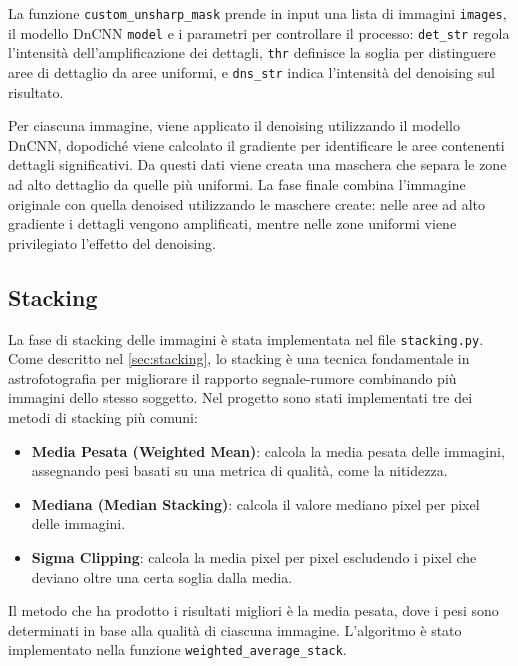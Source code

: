 La funzione \texttt{custom\_unsharp\_mask} prende in input una lista di immagini \texttt{images}, il modello DnCNN \texttt{model} e i parametri per controllare il processo: \texttt{det\_str} regola l'intensità dell'amplificazione dei dettagli, \texttt{thr} definisce la soglia per distinguere aree di dettaglio da aree uniformi, e \texttt{dns\_str} indica l'intensità del denoising sul risultato. 

Per ciascuna immagine, viene applicato il denoising utilizzando il modello DnCNN, dopodiché viene calcolato il gradiente per identificare le aree contenenti dettagli significativi. Da questi dati viene creata una maschera che separa le zone ad alto dettaglio da quelle più uniformi. La fase finale combina l'immagine originale con quella denoised utilizzando le maschere create: nelle aree ad alto gradiente i dettagli vengono amplificati, mentre nelle zone uniformi viene privilegiato l'effetto del denoising.

\subsection{Stacking} \label{subsec:stacking_impl}

La fase di stacking delle immagini è stata implementata nel file \texttt{stacking.py}. Come descritto nel \cref{sec:stacking}, lo stacking è una tecnica fondamentale in astrofotografia per migliorare il rapporto segnale-rumore combinando più immagini dello stesso soggetto. Nel progetto sono stati implementati tre dei metodi di stacking più comuni:

\begin{itemize}
    \item \textbf{Media Pesata (Weighted Mean)}: calcola la media pesata delle immagini, assegnando pesi basati su una metrica di qualità, come la nitidezza.
    \item \textbf{Mediana (Median Stacking)}: calcola il valore mediano pixel per pixel delle immagini.
    \item \textbf{Sigma Clipping}: calcola la media pixel per pixel escludendo i pixel che deviano oltre una certa soglia dalla media.
\end{itemize}

Il metodo che ha prodotto i risultati migliori è la media pesata, dove i pesi sono determinati in base alla qualità di ciascuna immagine. L'algoritmo è stato implementato nella funzione \texttt{weighted\_average\_stack}.

